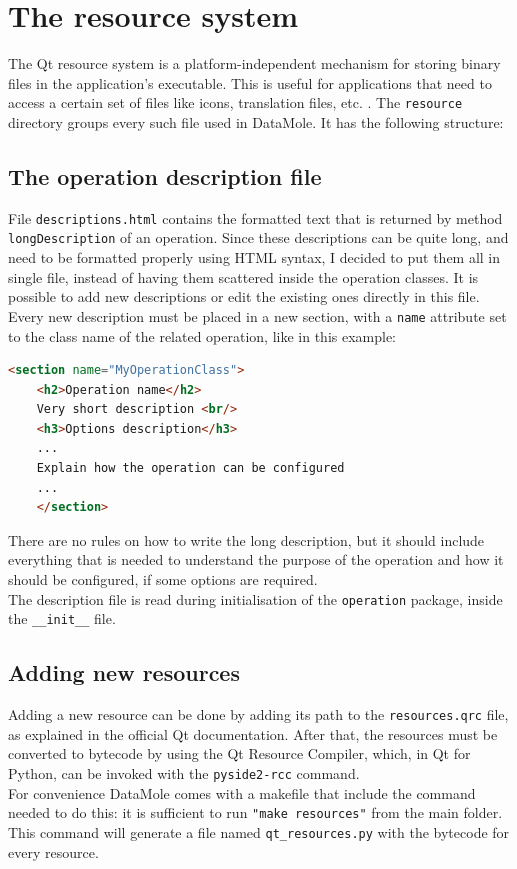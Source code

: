 \section{The resource system}\label{sec:resource-syst}
The Qt resource system is a platform-independent mechanism for storing binary files in the application's executable. This is useful for applications that need to access a certain set of files like icons, translation files, etc. \cite{docs:qt-resources}. The \texttt{resource} directory groups every such file used in DataMole. It has the following structure:\\

\subsection{The operation description file}
File \texttt{descriptions.html} contains the formatted text that is returned by method \texttt{longDescription} of an operation. Since these descriptions can be quite long, and need to be formatted properly using HTML syntax, I decided to put them all in single file, instead of having them scattered inside the operation classes. It is possible to add new descriptions or edit the existing ones directly in this file. Every new description must be placed in a new section, with a \texttt{name} attribute set to the class name of the related operation, like in this example:
\begin{lstlisting}[language=html,frame=none, backgroundcolor=\color{white}]
	<section name="MyOperationClass">
	<h2>Operation name</h2>
	Very short description <br/>
	<h3>Options description</h3>
	...
	Explain how the operation can be configured
	...
	</section>
\end{lstlisting}
There are no rules on how to write the long description, but it should include everything that is needed to understand the purpose of the operation and how it should be configured, if some options are required.\\
The description file is read during initialisation of the \texttt{operation} package, inside the \texttt{\_\_init\_\_} file.

\subsection{Adding new resources}
Adding a new resource can be done by adding its path to the \texttt{resources.qrc} file, as explained in the official Qt documentation. After that, the resources must be converted to bytecode by using the Qt Resource Compiler, which, in Qt for Python, can be invoked with the \texttt{pyside2-rcc} command.\\
For convenience DataMole comes with a makefile that include the command needed to do this: it is sufficient to run \texttt{"make resources"} from the main folder. This command will generate a file named \texttt{qt\_resources.py} with the bytecode for every resource.


